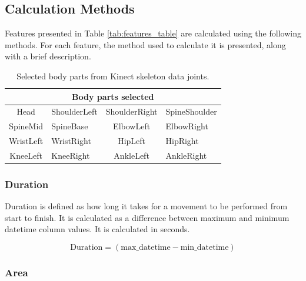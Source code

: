         \subsection{Calculation Methods}

            Features presented in Table \ref{tab:features_table} are calculated using the following methods. For each feature, the method used to calculate it is presented, along with a brief description.

            \begin{table}[ht]
                \centering
                \begin{tabular}{@{}clcl@{}}
                    \toprule
                    \multicolumn{4}{c}{\textbf{Body parts selected}} \\
                    \midrule
                     Head & ShoulderLeft & ShoulderRight & SpineShoulder \\
                     SpineMid & SpineBase & ElbowLeft & ElbowRight \\
                     WristLeft & WristRight & HipLeft & HipRight \\
                     KneeLeft & KneeRight & AnkleLeft & AnkleRight \\
                    \bottomrule
                \end{tabular}
                \caption{Selected body parts from Kinect skeleton data joints.}
                \label{tab:body_parts_table}
            \end{table} 

            \subsubsection{Duration}

                Duration is defined as how long it takes for a movement to be performed from start to finish. It is calculated as a difference between maximum and minimum datetime column values. It is calculated in seconds.

                \begin{equation}\label{eq:duration}
                    \text{Duration} = (\text{{max\_datetime}} - \text{{min\_datetime}})
                \end{equation}
            
            \subsubsection{Area}

